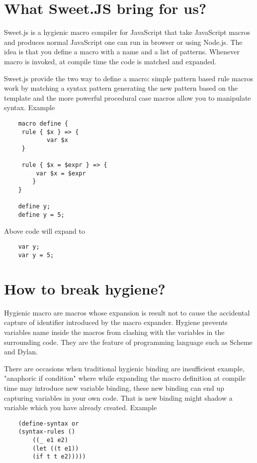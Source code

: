 \section{What Sweet.JS bring for us?}

Sweet.js is a hygienic macro compiler for JavaScript that take JavaScript macros and produces normal JavaScript one can run in browser or using Node.js. The idea is that you define a macro with a name and a list of patterns. Whenever macro is invoked, at compile time the code is matched and expanded. 

Sweet.js provide the two way to define a macro: simple pattern based rule macros work by matching a syntax pattern generating the new pattern based on the template and the more powerful procedural case macros allow you to manipulate syntax. Example

\begin{lstlisting}
	macro define {
   	 rule { $x } => {
   		    var $x
   	 }

   	 rule { $x = $expr } => {
   	     var $x = $expr
    	}
	}

	define y;
	define y = 5;
\end{lstlisting}

Above code will expand to

\begin{lstlisting}
	var y;
	var y = 5;
\end{lstlisting}

\section{How to break hygiene?}

Hygienic macro are macros whose expansion is result not to cause the accidental capture of identifier introduced by the macro expander. Hygiene prevents variables name inside the macros from clashing with the variables in the surrounding code. They are the feature of programming language such as Scheme and Dylan. 

There are occasions when traditional hygienic binding are insufficient example, "anaphoric if condition"
where while expanding the macro definition at compile time may introduce new variable binding, these new binding can end up capturing variables in your own code. That is new binding might shadow a variable which you have already created. Example

\begin{lstlisting}
	(define-syntax or
  	(syntax-rules ()
    	((_ e1 e2)
     	(let ((t e1))
       	(if t t e2)))))
\end{lstlisting}

